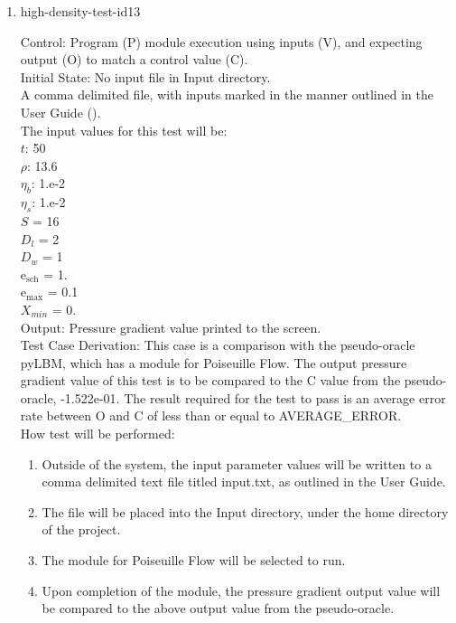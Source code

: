 \documentclass[12pt, titlepage]{article}
\begin{document}
\begin{enumerate}
\item{high-density-test-id13\\}

Control: Program (P) module execution using inputs (V), and expecting output (O) to match a control value (C).\\
					
Initial State: No input file in Input directory.\\
					
A comma delimited file, with inputs marked in the manner outlined in the User Guide (\citet{LBM_UserGuide_PM}).\\The input values for this test will be:\\
$t$: 50\\
$\rho$: 13.6\\
$\eta_b$: 1.e-2\\
$\eta_s$: 1.e-2\\
$S$ = 16\\
$D_{l}$ = 2\\
$D_{w}$ = 1\\
$\mathrm{e_{sch}}$ = 1.\\
$\mathrm{e_{max}}$ = 0.1\\
$X_{min}$ = 0.\\

					
Output: Pressure gradient value printed to the screen.  \\

Test Case Derivation: This case is a comparison with the pseudo-oracle pyLBM, which has a module for Poiseuille Flow. The output pressure gradient value of this test is to be compared to the C value from the pseudo-oracle, -1.522e-01. The result required for the test to pass is an average error rate between O and C of less than or equal to AVERAGE\_ERROR.\\

					
How test will be performed: 

\begin{enumerate}
\item Outside of the system, the input parameter values will be written to a comma delimited text file titled input.txt, as outlined in the User Guide.
\item The file will be placed into the Input directory, under the home directory of the project.
\item The module for Poiseuille Flow will be selected to run.
\item Upon completion of the module, the pressure gradient output value will be compared to the above output value from the pseudo-oracle.
\end{enumerate}	


\end{enumerate}
\end{document}

